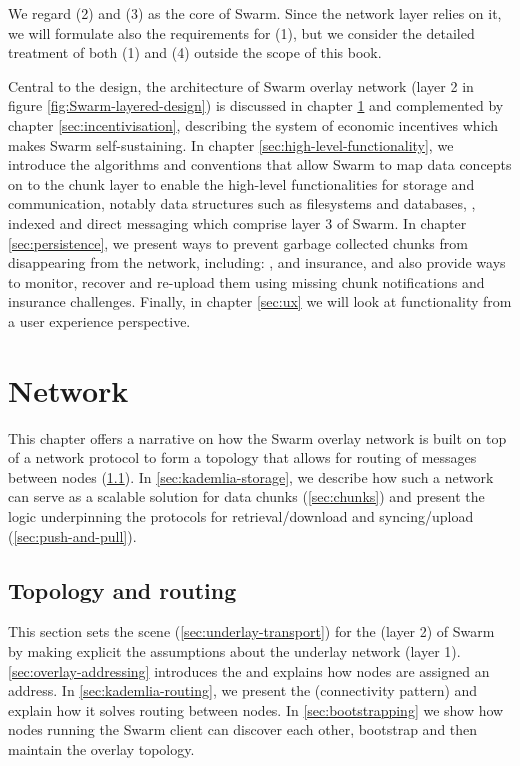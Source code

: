 We regard (2) and (3) as the core of Swarm. Since the network layer relies on it, we will formulate also the requirements for (1), but we consider the detailed treatment of both (1) and (4) outside the scope of this book.


Central to the design, the architecture of Swarm overlay network (layer 2 in figure \ref{fig:Swarm-layered-design}) is discussed in chapter \ref{sec:network} and complemented by chapter \ref{sec:incentivisation}, describing the system of economic incentives which makes Swarm self-sustaining. In chapter \ref{sec:high-level-functionality}, we introduce the algorithms and conventions that allow Swarm to map data concepts on to the chunk layer to enable the high-level functionalities for storage and communication, notably data structures such as filesystems and databases, , indexed  and direct messaging  which comprise layer 3 of Swarm.
In chapter \ref{sec:persistence}, we present ways to prevent garbage collected chunks from disappearing from the network, including: ,  and insurance, and also provide ways to monitor, recover and re-upload them using missing chunk notifications and insurance challenges. 
Finally, in chapter \ref{sec:ux} we will look at functionality from a user experience perspective.

\chapter{Network}\label{sec:network}

This chapter offers a narrative on how the Swarm overlay network is built on top of a  network protocol to form a topology that allows for routing of messages between nodes (\ref{sec:topology-routing}). In \ref{sec:kademlia-storage}, we describe how such a network can serve as a scalable  solution for data chunks (\ref{sec:chunks}) and present the logic underpinning the protocols for retrieval/download and syncing/upload (\ref{sec:push-and-pull}).

\section{Topology and routing \statusgreen}\label{sec:topology-routing}

This section sets the scene (\ref{sec:underlay-transport}) for the  (layer 2) of Swarm by making explicit the assumptions about the underlay network (layer 1). \ref{sec:overlay-addressing} introduces the  and explains how nodes are assigned an address. In  \ref{sec:kademlia-routing}, we present the   (connectivity pattern) and explain how it solves routing between nodes. In \ref{sec:bootstrapping} we show how nodes running the Swarm client can discover each other, bootstrap and then maintain the overlay topology.

